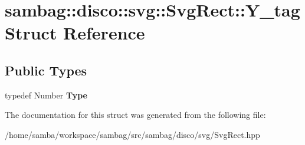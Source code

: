 \hypertarget{structsambag_1_1disco_1_1svg_1_1_svg_rect_1_1_y__tag}{
\section{sambag::disco::svg::SvgRect::Y\_\-tag Struct Reference}
\label{structsambag_1_1disco_1_1svg_1_1_svg_rect_1_1_y__tag}
}
\subsection*{Public Types}
\begin{DoxyCompactItemize}
\item 
\hypertarget{structsambag_1_1disco_1_1svg_1_1_svg_rect_1_1_y__tag_a3b6bd9e125e2f3398973beec4be6e115}{
typedef Number {\bfseries Type}}
\label{structsambag_1_1disco_1_1svg_1_1_svg_rect_1_1_y__tag_a3b6bd9e125e2f3398973beec4be6e115}

\end{DoxyCompactItemize}


The documentation for this struct was generated from the following file:\begin{DoxyCompactItemize}
\item 
/home/samba/workspace/sambag/src/sambag/disco/svg/SvgRect.hpp\end{DoxyCompactItemize}

